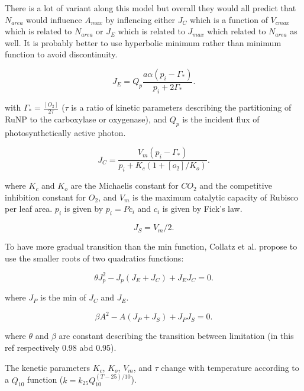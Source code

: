 \documentclass[a4paper,11pt]{article}
\begin{document}
There is a lot of variant along this model but
overall they would all predict that $N_{area}$ would influence
$A_{max}$ by inflencing either $J_C$ which is a function of $V_{cmax}$
which is related to $N_{area}$ or $J_E$ which is related to $J_{max}$
which related to $N_{area}$ as well. It is probably better to use
hyperbolic minimum rather than minimum function to avoid
discontinuity. 


\begin{equation}
\label{eq:JC}
J_E = Q_p \frac{a \alpha (p_i - \Gamma_*)}{p_i + 2 \Gamma_*}.
\end{equation}

with $\Gamma_* = \frac{[O_2]}{2\tau}$ ($\tau$ is a ratio of kinetic parameters describing the partitioning of RuNP to the carboxylase or oxygenase), and $Q_p$ is the incident flux of photosynthetically active photon.

\begin{equation}
\label{eq:JE}
J_C= \frac{V_m (p_i - \Gamma_*)}{p_i + K_c (1+[o_2]/K_o)}.
\end{equation}

where $K_c$ and $K_o$ are the Michaelis constant for $CO_2$ and the competitive inhibition constant for $O_2$, and $V_m$ is the maximum catalytic capacity of Rubisco per leaf area.
$p_i$ is given by $p_i = P c_i$ and $c_i$ is given by Fick's law.

\begin{equation}
\label{eq:JS}
J_S= V_m/2.
\end{equation}

To have more gradual transition than the min function, Collatz et al. propose to use the smaller roots of two quadratics functions:

\begin{equation}
\label{eq:Q1}
\theta J_p^2 - J_p(J_E+J_C) + J_E J_C= 0.
\end{equation}

where $J_P$ is the min of $J_C$ and $J_E$.

\begin{equation}
\label{eq:Q2}
\beta A^2 - A(J_P+J_S) + J_P J_S= 0.
\end{equation}

where $\theta$ and $\beta$ are constant describing the transition between limitation (in this ref respectively 0.98 abd 0.95).

The kenetic parameters $K_c$, $K_o$, $V_m$, and $\tau$ change with temperature according to a $Q_{10}$ function ($k = k_{25} Q_{10}^{(T-25)/10}$).
\end{document}
